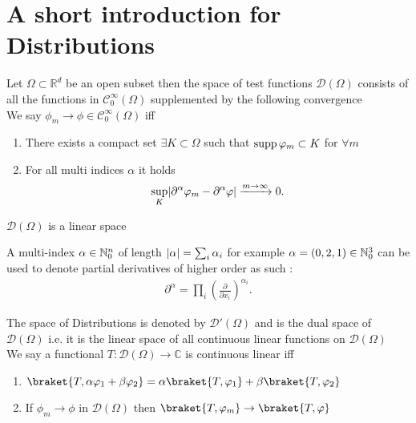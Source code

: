 \section{A short introduction for Distributions}
\begin{definition}
 Let $\Omega  \subset  \mathbb{R}^{d} $  be an open subset then the space of test functions $\mathcal{D}(\Omega )$
 consists of all the functions in $\mathcal{C}_0^{\infty}(\Omega ) $ supplemented by the following convergence \\[1ex]
 We say $\phi_m \to  \phi \in  \mathcal{C}_0^{\infty}(\Omega ) $ iff 
 \begin{enumerate}
   \item There exists a compact set $\exists K \subset  \Omega $ such that $\operatorname*{supp} \varphi_m \subset  K$ for $\forall m$
   \item For all multi indices $\alpha $ it holds 
     \begin{align*}
       \sup_K \lvert\partial ^{\alpha } \varphi_m - \partial ^{\alpha } \varphi   \rvert \xrightarrow{m\to \infty}  0 
     .\end{align*}
 \end{enumerate}
\end{definition}
\begin{remark}
 $\mathcal{D}(\Omega )$  is a linear space
\end{remark}
\begin{definition}
A multi-index $\alpha \in \mathbb{N}_0^n$ of length $\lvert\alpha \rvert = \sum_{i} \alpha_i$
for example $\alpha  = (0,2,1) \in \mathbb{N}^3_0$  can be used to denote partial derivatives of higher order as such : 
\begin{align*}
  \partial^{\alpha } = \prod_i (\frac{\partial}{\partial x_i})^{\alpha_i}
.\end{align*}
\end{definition}
\begin{definition}[Distribution]
 The space of Distributions is denoted by $\mathcal{D}'(\Omega )$  and is the dual space of $\mathcal{D}(\Omega)$
 i.e. it is the linear space of all continuous linear functions on $\mathcal{D}(\Omega )$ \\[1ex]
 We say a functional $T :\mathcal{D}(\Omega ) \to \mathbb{C}$ is continuous linear iff 
 \begin{enumerate}
   \item $\braket{T,\alpha \phi_1+ \beta \phi_2} = \alpha \braket{T,\phi_1} + \beta \braket{T,\phi_2}$ 
   \item If $\phi_m \to  \phi $ in $\mathcal{D}(\Omega )$ then $\braket{T,\phi_m} \to \braket{T,\phi }$
 \end{enumerate}
\end{definition}
